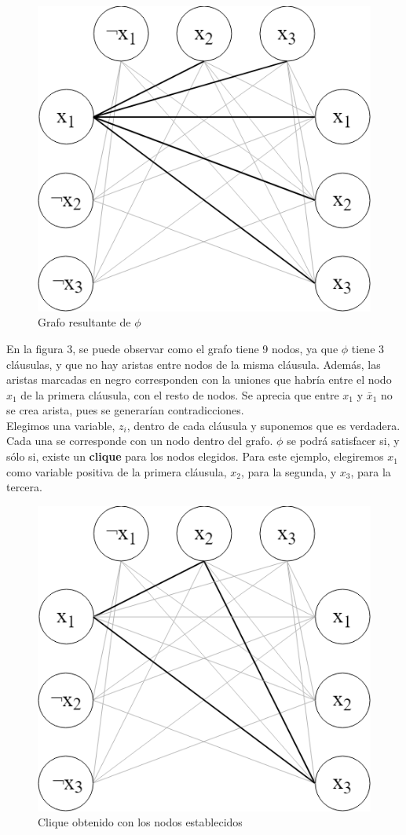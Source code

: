 \documentclass{article}
\begin{document}
\begin{figure}[h!]
\centering
\includegraphics[width=0.8\linewidth]{img/Grafo_Ejemplo_Clique.png}
\caption{Grafo resultante de $\phi$}
\end{figure}

En la figura 3, se puede observar como el grafo tiene 9 nodos, ya que $\phi$ tiene 3 cláusulas, y que no hay aristas entre nodos de la misma cláusula. Además, las aristas marcadas en negro corresponden con la uniones que habría entre el nodo ${x}_{1}$ de la primera cláusula, con el resto de nodos. Se aprecia que entre ${x}_{1}$ y $\bar{x}_{1}$ no se crea arista, pues se generarían contradicciones.\\

Elegimos una variable, $z_{i}$, dentro de cada cláusula y suponemos que es verdadera. Cada una se corresponde con un nodo dentro del grafo. $\phi$ se podrá satisfacer si, y sólo si, existe un \textbf{clique} para los nodos elegidos. Para este ejemplo, elegiremos $x_{1}$ como variable positiva de la primera cláusula,  $x_{2}$, para la segunda, y $x_{3}$, para la tercera.

\begin{figure}[h!]
\centering
\includegraphics[width=0.8\linewidth]{img/Grafo_Seleccion_Clique.png}
\caption{Clique obtenido con los nodos establecidos}
\end{figure}
\end{document}
